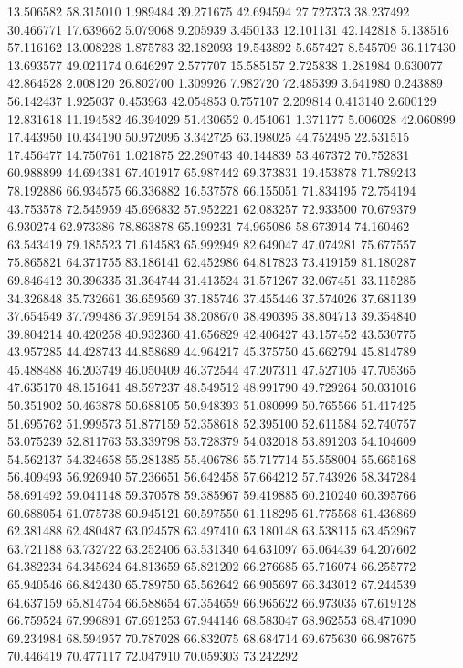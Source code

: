 13.506582
58.315010
1.989484
39.271675
42.694594
27.727373
38.237492
30.466771
17.639662
5.079068
9.205939
3.450133
12.101131
42.142818
5.138516
57.116162
13.008228
1.875783
32.182093
19.543892
5.657427
8.545709
36.117430
13.693577
49.021174
0.646297
2.577707
15.585157
2.725838
1.281984
0.630077
42.864528
2.008120
26.802700
1.309926
7.982720
72.485399
3.641980
0.243889
56.142437
1.925037
0.453963
42.054853
0.757107
2.209814
0.413140
2.600129
12.831618
11.194582
46.394029
51.430652
0.454061
1.371177
5.006028
42.060899
17.443950
10.434190
50.972095
3.342725
63.198025
44.752495
22.531515
17.456477
14.750761
1.021875
22.290743
40.144839
53.467372
70.752831
60.988899
44.694381
67.401917
65.987442
69.373831
19.453878
71.789243
78.192886
66.934575
66.336882
16.537578
66.155051
71.834195
72.754194
43.753578
72.545959
45.696832
57.952221
62.083257
72.933500
70.679379
6.930274
62.973386
78.863878
65.199231
74.965086
58.673914
74.160462
63.543419
79.185523
71.614583
65.992949
82.649047
47.074281
75.677557
75.865821
64.371755
83.186141
62.452986
64.817823
73.419159
81.180287
69.846412
30.396335
31.364744
31.413524
31.571267
32.067451
33.115285
34.326848
35.732661
36.659569
37.185746
37.455446
37.574026
37.681139
37.654549
37.799486
37.959154
38.208670
38.490395
38.804713
39.354840
39.804214
40.420258
40.932360
41.656829
42.406427
43.157452
43.530775
43.957285
44.428743
44.858689
44.964217
45.375750
45.662794
45.814789
45.488488
46.203749
46.050409
46.372544
47.207311
47.527105
47.705365
47.635170
48.151641
48.597237
48.549512
48.991790
49.729264
50.031016
50.351902
50.463878
50.688105
50.948393
51.080999
50.765566
51.417425
51.695762
51.999573
51.877159
52.358618
52.395100
52.611584
52.740757
53.075239
52.811763
53.339798
53.728379
54.032018
53.891203
54.104609
54.562137
54.324658
55.281385
55.406786
55.717714
55.558004
55.665168
56.409493
56.926940
57.236651
56.642458
57.664212
57.743926
58.347284
58.691492
59.041148
59.370578
59.385967
59.419885
60.210240
60.395766
60.688054
61.075738
60.945121
60.597550
61.118295
61.775568
61.436869
62.381488
62.480487
63.024578
63.497410
63.180148
63.538115
63.452967
63.721188
63.732722
63.252406
63.531340
64.631097
65.064439
64.207602
64.382234
64.345624
64.813659
65.821202
66.276685
65.716074
66.255772
65.940546
66.842430
65.789750
65.562642
66.905697
66.343012
67.244539
64.637159
65.814754
66.588654
67.354659
66.965622
66.973035
67.619128
66.759524
67.996891
67.691253
67.944146
68.583047
68.962553
68.471090
69.234984
68.594957
70.787028
66.832075
68.684714
69.675630
66.987675
70.446419
70.477117
72.047910
70.059303
73.242292

